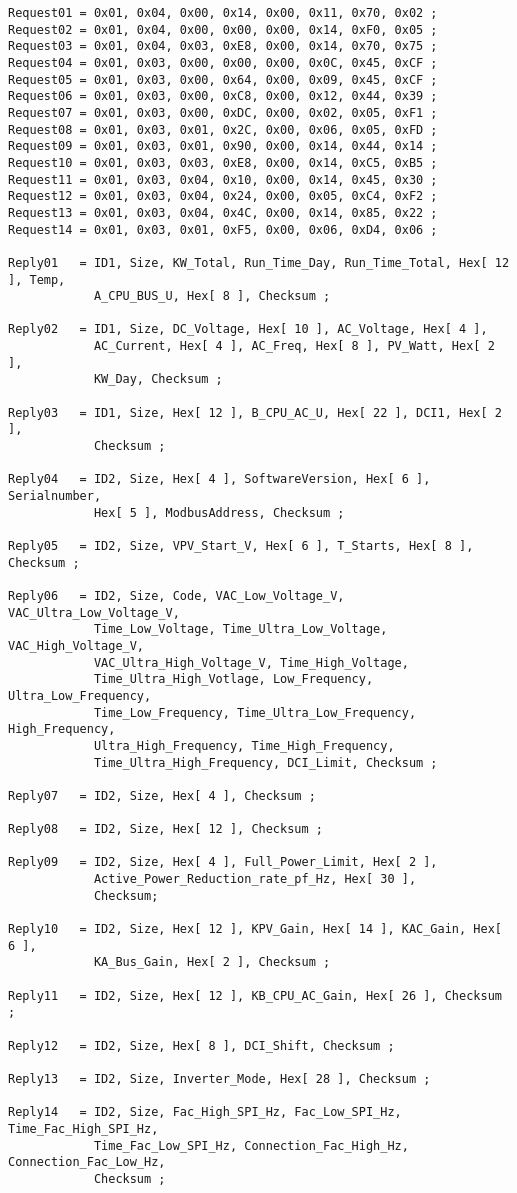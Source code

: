 \begin{verbatim}
Request01 = 0x01, 0x04, 0x00, 0x14, 0x00, 0x11, 0x70, 0x02 ;
Request02 = 0x01, 0x04, 0x00, 0x00, 0x00, 0x14, 0xF0, 0x05 ;
Request03 = 0x01, 0x04, 0x03, 0xE8, 0x00, 0x14, 0x70, 0x75 ;
Request04 = 0x01, 0x03, 0x00, 0x00, 0x00, 0x0C, 0x45, 0xCF ;
Request05 = 0x01, 0x03, 0x00, 0x64, 0x00, 0x09, 0x45, 0xCF ;
Request06 = 0x01, 0x03, 0x00, 0xC8, 0x00, 0x12, 0x44, 0x39 ;
Request07 = 0x01, 0x03, 0x00, 0xDC, 0x00, 0x02, 0x05, 0xF1 ;
Request08 = 0x01, 0x03, 0x01, 0x2C, 0x00, 0x06, 0x05, 0xFD ;
Request09 = 0x01, 0x03, 0x01, 0x90, 0x00, 0x14, 0x44, 0x14 ;
Request10 = 0x01, 0x03, 0x03, 0xE8, 0x00, 0x14, 0xC5, 0xB5 ;
Request11 = 0x01, 0x03, 0x04, 0x10, 0x00, 0x14, 0x45, 0x30 ;
Request12 = 0x01, 0x03, 0x04, 0x24, 0x00, 0x05, 0xC4, 0xF2 ;
Request13 = 0x01, 0x03, 0x04, 0x4C, 0x00, 0x14, 0x85, 0x22 ;
Request14 = 0x01, 0x03, 0x01, 0xF5, 0x00, 0x06, 0xD4, 0x06 ;

Reply01   = ID1, Size, KW_Total, Run_Time_Day, Run_Time_Total, Hex[ 12 ], Temp, 
            A_CPU_BUS_U, Hex[ 8 ], Checksum ;

Reply02   = ID1, Size, DC_Voltage, Hex[ 10 ], AC_Voltage, Hex[ 4 ], 
            AC_Current, Hex[ 4 ], AC_Freq, Hex[ 8 ], PV_Watt, Hex[ 2 ],
            KW_Day, Checksum ;

Reply03   = ID1, Size, Hex[ 12 ], B_CPU_AC_U, Hex[ 22 ], DCI1, Hex[ 2 ], 
            Checksum ;
            
Reply04   = ID2, Size, Hex[ 4 ], SoftwareVersion, Hex[ 6 ], Serialnumber, 
            Hex[ 5 ], ModbusAddress, Checksum ;
            
Reply05   = ID2, Size, VPV_Start_V, Hex[ 6 ], T_Starts, Hex[ 8 ], Checksum ;

Reply06   = ID2, Size, Code, VAC_Low_Voltage_V, VAC_Ultra_Low_Voltage_V,
            Time_Low_Voltage, Time_Ultra_Low_Voltage, VAC_High_Voltage_V,
            VAC_Ultra_High_Voltage_V, Time_High_Voltage, 
            Time_Ultra_High_Votlage, Low_Frequency, Ultra_Low_Frequency,
            Time_Low_Frequency, Time_Ultra_Low_Frequency, High_Frequency, 
            Ultra_High_Frequency, Time_High_Frequency, 
            Time_Ultra_High_Frequency, DCI_Limit, Checksum ;

Reply07   = ID2, Size, Hex[ 4 ], Checksum ;

Reply08   = ID2, Size, Hex[ 12 ], Checksum ;

Reply09   = ID2, Size, Hex[ 4 ], Full_Power_Limit, Hex[ 2 ], 
            Active_Power_Reduction_rate_pf_Hz, Hex[ 30 ],
            Checksum;

Reply10   = ID2, Size, Hex[ 12 ], KPV_Gain, Hex[ 14 ], KAC_Gain, Hex[ 6 ],
            KA_Bus_Gain, Hex[ 2 ], Checksum ;

Reply11   = ID2, Size, Hex[ 12 ], KB_CPU_AC_Gain, Hex[ 26 ], Checksum ;

Reply12   = ID2, Size, Hex[ 8 ], DCI_Shift, Checksum ;

Reply13   = ID2, Size, Inverter_Mode, Hex[ 28 ], Checksum ;

Reply14   = ID2, Size, Fac_High_SPI_Hz, Fac_Low_SPI_Hz, Time_Fac_High_SPI_Hz,
            Time_Fac_Low_SPI_Hz, Connection_Fac_High_Hz, Connection_Fac_Low_Hz, 
            Checksum ;
\end{verbatim} 


